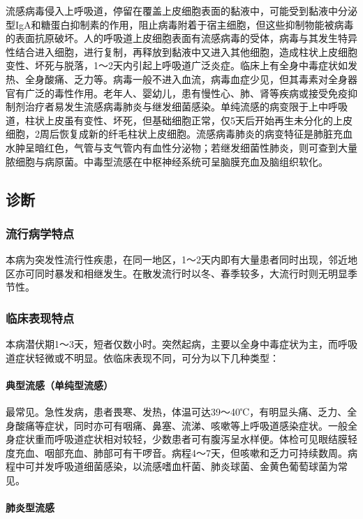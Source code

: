 流感病毒侵入上呼吸道，停留在覆盖上皮细胞表面的黏液中，可能受到黏液中分泌型IgA和糖蛋白抑制素的作用，阻止病毒附着于宿主细胞，但这些抑制物能被病毒的表面抗原破坏。人的呼吸道上皮细胞表面有流感病毒的受体，病毒与其发生特异性结合进入细胞，进行复制，再释放到黏液中又进入其他细胞，造成柱状上皮细胞变性、坏死与脱落，1～2天内引起上呼吸道广泛炎症。临床上有全身中毒症状如发热、全身酸痛、乏力等。病毒一般不进入血流，病毒血症少见，但其毒素对全身器官有广泛的毒性作用。老年人、婴幼儿，患有慢性心、肺、肾等疾病或接受免疫抑制剂治疗者易发生流感病毒肺炎与继发细菌感染。单纯流感的病变限于上中呼吸道，柱状上皮虽有变性、坏死，但基础细胞正常，仅5天后开始再生未分化的上皮细胞，2周后恢复成新的纤毛柱状上皮细胞。流感病毒肺炎的病变特征是肺脏充血水肿呈暗红色，气管与支气管内有血性分泌物；若继发细菌性肺炎，则可查到大量脓细胞与病原菌。中毒型流感在中枢神经系统可呈脑膜充血及脑组织软化。

\subsection{诊断}

\subsubsection{流行病学特点}

本病为突发性流行性疾患，在同一地区，1～2天内即有大量患者同时出现，邻近地区亦可同时暴发和相继发生。在散发流行时以冬、春季较多，大流行时则无明显季节性。

\subsubsection{临床表现特点}

本病潜伏期1～3天，短者仅数小时。突然起病，主要以全身中毒症状为主，而呼吸道症状轻微或不明显。依临床表现不同，可分为以下几种类型：

\paragraph{典型流感（单纯型流感）}

最常见。急性发病，患者畏寒、发热，体温可达39～40℃，有明显头痛、乏力、全身酸痛等症状，同时亦可有咽痛、鼻塞、流涕、咳嗽等上呼吸道感染症状。一般全身症状重而呼吸道症状相对较轻，少数患者可有腹泻呈水样便。体检可见眼结膜轻度充血、咽部充血、肺部可有干啰音。病程4～7天，但咳嗽和乏力可持续数周。病程中可并发呼吸道细菌感染，以流感嗜血杆菌、肺炎球菌、金黄色葡萄球菌为常见。

\paragraph{肺炎型流感}


